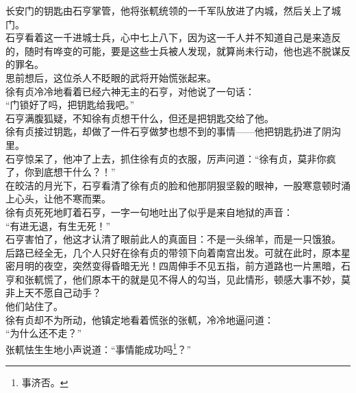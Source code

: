 \begin{multicols}{\theparacolNo}
长安门的钥匙由石亨掌管，他将张軏统领的一千军队放进了内城，然后关上了城门。\\

石亨看着这一千进城士兵，心中七上八下，因为这一千人并不知道自己是来造反的，随时有哗变的可能，要是这些士兵被人发现，就算尚未行动，他也逃不脱谋反的罪名。\\

思前想后，这位杀人不眨眼的武将开始慌张起来。\\

徐有贞冷冷地看着已经六神无主的石亨，对他说了一句话：\\

“门锁好了吗，把钥匙给我吧。”\\

石亨满腹狐疑，不知徐有贞想干什么，但还是把钥匙交给了他。\\

徐有贞接过钥匙，却做了一件石亨做梦也想不到的事情——他把钥匙扔进了阴沟里。\\

石亨惊呆了，他冲了上去，抓住徐有贞的衣服，厉声问道：“徐有贞，莫非你疯了，你到底想干什么？！”\\

在皎洁的月光下，石亨看清了徐有贞的脸和他那阴狠坚毅的眼神，一股寒意顿时涌上心头，让他不寒而栗。\\

徐有贞死死地盯着石亨，一字一句地吐出了似乎是来自地狱的声音：\\

“有进无退，有生无死！”\\

石亨害怕了，他这才认清了眼前此人的真面目：不是一头绵羊，而是一只饿狼。\\

后路已经全无，几个人只好在徐有贞的带领下向着南宫出发。可就在此时，原本星密月明的夜空，突然变得昏暗无光！四周伸手不见五指，前方道路也一片黑暗，石亨和张軏慌了，他们原本干的就是见不得人的勾当，见此情形，顿感大事不妙，莫非上天不愿自己动手？\\

他们站住了。\\

徐有贞却不为所动，他镇定地看着慌张的张軏，冷冷地逼问道：\\

“为什么还不走？”\\

张軏怯生生地小声说道：“事情能成功吗\footnote{事济否。}？”\\


\end{multicols}
